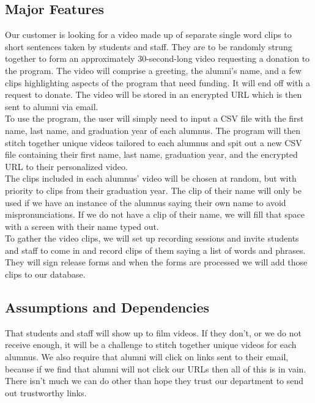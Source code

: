 \subsection{Major Features}
Our customer is looking for a video made up of separate single word clips to short sentences taken by students and staff. 
They are to be randomly strung together to form an approximately 30-second-long video requesting a donation to the program. 
The video will comprise a greeting, the alumni's name, and a few clips highlighting aspects of the program that need funding. 
It will end off with a request to donate. The video will be stored in an encrypted URL which is then sent to alumni via email.\\
To use the program, the user will simply need to input a CSV file with the first name, last name, and graduation year of each alumnus. 
The program will then stitch together unique videos tailored to each alumnus and spit out a new CSV file containing their 
first name, last name, graduation year, and the encrypted URL to their personalized video.\\
The clips included in each alumnus' video will be chosen at random, but with priority to clips from their graduation year. 
The clip of their name will only be used if we have an instance of the alumnus saying their own name to avoid mispronunciations. 
If we do not have a clip of their name, we will fill that space with a screen with their name typed out.\\
To gather the video clips, we will set up recording sessions and invite students and staff to come in and record clips of 
them saying a list of words and phrases. They will sign release forms and when the forms are processed we will add those clips to our database.

\subsection{Assumptions and Dependencies}
That students and staff will show up to film videos. If they don't, or we do not receive enough, it will be a 
challenge to stitch together unique videos for each alumnus.
We also require that  alumni will click on links sent to their email, because if we find that alumni will not click our URLs 
then all of this is in vain. There isn't much we can do other than hope they trust our department to send out trustworthy links.